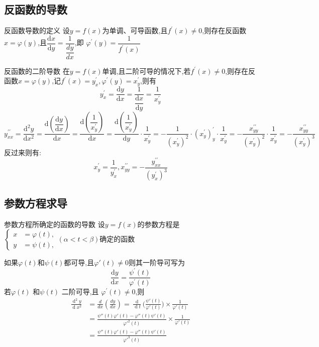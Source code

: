 \documentclass[8pt a4paper, oneside, UTF8]{ctexbook}  %
\begin{document}
\begin{sloppypar}
    \subsection{反函数的导数}
    \begin{defn}{反函数导数的定义}{}
        设$y=f(x)$为单调、可导函数,且$f^{\prime}(x)\neq0$,则存在反函数$x=\varphi(y)$,且$\dfrac{\mathrm{d}x}{\mathrm{d}y}=\dfrac{1}{\dfrac{dy}{dx}}$,即 $\varphi^{\prime}(y)=\dfrac1{f^{\prime}(x)}$
    \end{defn}
    \begin{criterion}{反函数的二阶导数}{}
        在$y=f(x)$单调,且二阶可导的情况下,若$f^{\prime}(x)\neq0$,则存在反函数$x=\varphi(y)$,记$f^{\prime}(x)=y_x^{\prime},\varphi^{\prime}\left(y\right)=x_{y}^{\prime}$,则有
        $$
            y_{x}^{\prime}=\dfrac{\mathrm{d}y}{\mathrm{d}x}=\dfrac{1}{\dfrac{\mathrm{d}x}{\mathrm{d}y}}=\frac{1}{x_{y}^{\prime}}
        $$
        $$
            y_{xx}^{\prime\prime}=\dfrac{\mathrm{d}^{2}y}{\mathrm{d}x^{2}}=\dfrac{\mathrm{d}\left(\dfrac{\mathrm{d}y}{\mathrm{d}x}\right)}{\mathrm{d}x}=\dfrac{\mathrm{d}\left(\dfrac{1}{x_{y}^{\prime}}\right)}{\mathrm{d}x}=\dfrac{\mathrm{d}\left(\dfrac{1}{x_{y}^{\prime}}\right)}{\mathrm{d}y}\cdot\dfrac{1}{x_{y}^{\prime}}=-\dfrac{1}{(x_{y}^{\prime})^{2}}\cdot(x_{y}^{\prime})_{y}^{\prime}\cdot\dfrac{1}{x_{y}^{\prime}}=-\dfrac{x_{yy}^{\prime\prime}}{(x_{y}^{\prime})^{2}}\cdot\dfrac{1}{x_{y}^{\prime}}=-\dfrac{x_{yy}^{\prime\prime}}{(x_{y}^{\prime})^{3}}
        $$
        反过来则有:
        $$
            x_{y}^{\prime}=\dfrac{1}{y_{x}^{\prime}},x_{yy}^{\prime\prime}=-\dfrac{y_{xx}^{\prime\prime}}{(y_{x}^{\prime})^{3}}
        $$
    \end{criterion}
    \subsection{参数方程求导}
    \begin{defn}{参数方程所确定的函数的导数}{}
        设$y=f(x)$的参数方程是$\left\{\begin{aligned}x&=\varphi(t),\\y&=\psi (t),\end{aligned}\right.(\alpha<t<\beta)$确定的函数

        如果$\varphi(t)$和$\psi(t)$都可导,且$\varphi'(t) \neq 0$则其一阶导可写为
        $$
            \dfrac{\mathrm{d}y}{\mathrm{d}x}=\frac{\psi^{\prime}(t)}{\varphi^{\prime}(t)}
        $$
        若$\varphi(t)$ 和$\psi(t)$ 二阶可导,且 $\varphi^{\prime}(t)\neq 0$,则
        $$
            \begin{aligned}
                \frac{\operatorname{d}^2y}{\operatorname{d}x^2} & =\frac{d}{dx}(\frac{dy}{dx}) =\frac{\operatorname{d}}{\operatorname{d}t}\Big(\frac{\psi'(t)}{\varphi'(t)}\Big) \times \frac{1}{\varphi'(t)} \\
                & =\frac{\psi''(t)\varphi'(t)-\varphi''(t)\psi'(t)}{\varphi'^2(t)}\times \frac{1}{\varphi'(t)}                                                \\
                & =\frac{\psi''(t)\varphi'(t)-\varphi''(t)\psi'(t)}{\varphi'^3(t)}
            \end{aligned}
        $$
    \end{defn}

\end{sloppypar}
\end{document}
